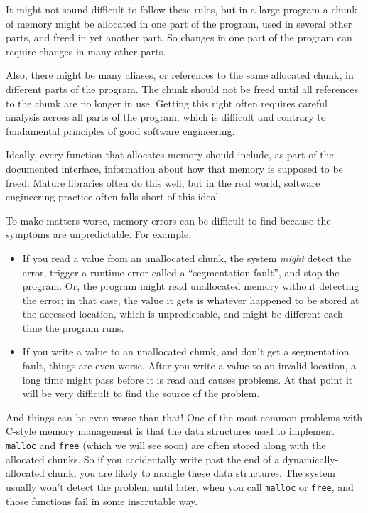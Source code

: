 \documentclass[12pt]{book}
\begin{document}
{It might not sound difficult to follow these rules, but in a large
program a chunk of memory might be allocated in one part of the
program, used in several other parts, and freed in yet another
part.  So changes in one part of the program can require changes
in many other parts.

Also, there might be many aliases, or references to the same allocated
chunk, in different parts of the program.  The chunk should not be
freed until all references to the chunk are no longer in use.  
Getting this right often requires careful analysis across all parts
of the program, which is difficult and contrary to fundamental
principles of good software engineering.

Ideally, every function that allocates memory should include, as part
of the documented interface, information about how that memory is supposed
to be freed.  Mature libraries often do this well, but in the real world,
software engineering practice often falls short of this ideal.

To make matters worse, memory errors can be difficult
to find because the symptoms are unpredictable.  For example:

\begin{itemize}

\item If you read a value from an unallocated chunk, the system {\em might} detect the error, trigger a runtime error called a ``segmentation fault'', and stop the program.  Or, the program might read unallocated memory without detecting the error; in that case, the value it gets is whatever happened to be stored at the accessed location, which is unpredictable, and might be different each time the program runs.

\item If you write a value to an unallocated chunk, and don't get a segmentation fault, things are even worse.  After you write a value to an invalid location, a long time might pass before it is read and causes problems.  At that point it will be very difficult to find the source of the problem.

\end{itemize} 

And things can be even worse than that!  One of the most common
problems with C-style memory management is that the data structures
used to implement {\tt malloc} and {\tt free} (which we will see soon)
are often stored along with the allocated chunks.  So if you
accidentally write past the end of a dynamically-allocated chunk, you
are likely to mangle these data structures.  The system usually won't
detect the problem until later, when you call {\tt malloc} or
{\tt free}, and those functions fail in some inscrutable way.

}
\end{document}

